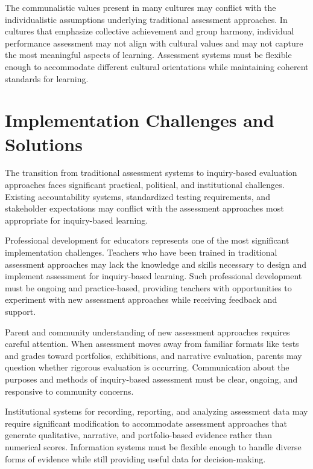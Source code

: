 \documentclass[
  Letterpaper,
]{scrbook}
\begin{document}
The communalistic values present in many cultures may conflict with the
individualistic assumptions underlying traditional assessment
approaches. In cultures that emphasize collective achievement and group
harmony, individual performance assessment may not align with cultural
values and may not capture the most meaningful aspects of learning.
Assessment systems must be flexible enough to accommodate different
cultural orientations while maintaining coherent standards for learning.

\section{Implementation Challenges and
Solutions}\label{implementation-challenges-and-solutions}

The transition from traditional assessment systems to inquiry-based
evaluation approaches faces significant practical, political, and
institutional challenges. Existing accountability systems, standardized
testing requirements, and stakeholder expectations may conflict with the
assessment approaches most appropriate for inquiry-based learning.

Professional development for educators represents one of the most
significant implementation challenges. Teachers who have been trained in
traditional assessment approaches may lack the knowledge and skills
necessary to design and implement assessment for inquiry-based learning.
Such professional development must be ongoing and practice-based,
providing teachers with opportunities to experiment with new assessment
approaches while receiving feedback and support.

Parent and community understanding of new assessment approaches requires
careful attention. When assessment moves away from familiar formats like
tests and grades toward portfolios, exhibitions, and narrative
evaluation, parents may question whether rigorous evaluation is
occurring. Communication about the purposes and methods of inquiry-based
assessment must be clear, ongoing, and responsive to community concerns.

Institutional systems for recording, reporting, and analyzing assessment
data may require significant modification to accommodate assessment
approaches that generate qualitative, narrative, and portfolio-based
evidence rather than numerical scores. Information systems must be
flexible enough to handle diverse forms of evidence while still
providing useful data for decision-making.
\end{document}

